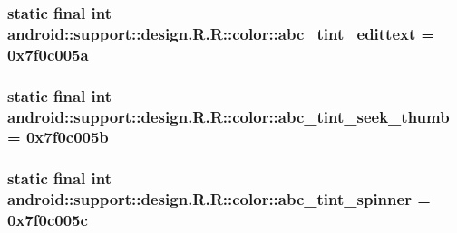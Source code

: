 \hypertarget{classandroid_1_1support_1_1design_1_1_r_1_1color_764f1b7498133fdf77038e549bcf178d}{
\subsubsection[{abc\_\-tint\_\-edittext}]{\setlength{\rightskip}{0pt plus 5cm}static final int android::support::design.R.R::color::abc\_\-tint\_\-edittext = 0x7f0c005a}}
\label{classandroid_1_1support_1_1design_1_1_r_1_1color_764f1b7498133fdf77038e549bcf178d}


\hypertarget{classandroid_1_1support_1_1design_1_1_r_1_1color_12e6476b6aa3209265cd4c77ed45ec60}{
\subsubsection[{abc\_\-tint\_\-seek\_\-thumb}]{\setlength{\rightskip}{0pt plus 5cm}static final int android::support::design.R.R::color::abc\_\-tint\_\-seek\_\-thumb = 0x7f0c005b}}
\label{classandroid_1_1support_1_1design_1_1_r_1_1color_12e6476b6aa3209265cd4c77ed45ec60}


\hypertarget{classandroid_1_1support_1_1design_1_1_r_1_1color_7e22e73a643e39bad64625ccfe45274a}{
\subsubsection[{abc\_\-tint\_\-spinner}]{\setlength{\rightskip}{0pt plus 5cm}static final int android::support::design.R.R::color::abc\_\-tint\_\-spinner = 0x7f0c005c}}
\label{classandroid_1_1support_1_1design_1_1_r_1_1color_7e22e73a643e39bad64625ccfe45274a}



